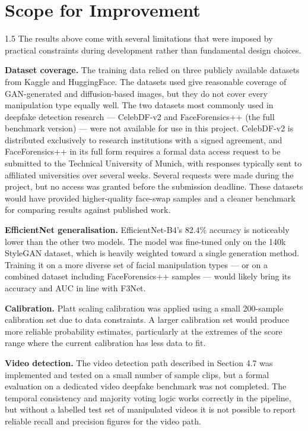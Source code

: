 \section{Scope for Improvement}

\begin{spacing}{1.5}
The results above come with several limitations that were imposed by practical constraints during development rather than fundamental design choices.

\noindent\textbf{Dataset coverage.}\quad
The training data relied on three publicly available datasets from Kaggle and HuggingFace. The datasets used give reasonable coverage of GAN-generated and diffusion-based images, but they do not cover every manipulation type equally well. The two datasets most commonly used in deepfake detection research --- CelebDF-v2 and FaceForensics++ (the full benchmark version) --- were not available for use in this project. CelebDF-v2 is distributed exclusively to research institutions with a signed agreement, and FaceForensics++ in its full form requires a formal data access request to be submitted to the Technical University of Munich, with responses typically sent to affiliated universities over several weeks. Several requests were made during the project, but no access was granted before the submission deadline. These datasets would have provided higher-quality face-swap samples and a cleaner benchmark for comparing results against published work.

\noindent\textbf{EfficientNet generalisation.}\quad
EfficientNet-B4's 82.4\% accuracy is noticeably lower than the other two models. The model was fine-tuned only on the 140k StyleGAN dataset, which is heavily weighted toward a single generation method. Training it on a more diverse set of facial manipulation types --- or on a combined dataset including FaceForensics++ samples --- would likely bring its accuracy and AUC in line with F3Net.

\noindent\textbf{Calibration.}\quad
Platt scaling calibration was applied using a small 200-sample calibration set due to data constraints. A larger calibration set would produce more reliable probability estimates, particularly at the extremes of the score range where the current calibration has less data to fit.

\noindent\textbf{Video detection.}\quad
The video detection path described in Section 4.7 was implemented and tested on a small number of sample clips, but a formal evaluation on a dedicated video deepfake benchmark was not completed. The temporal consistency and majority voting logic works correctly in the pipeline, but without a labelled test set of manipulated videos it is not possible to report reliable recall and precision figures for the video path.


\end{spacing}
